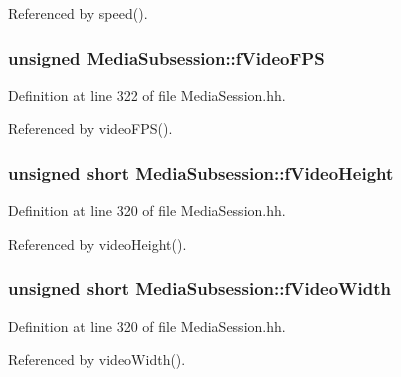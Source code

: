 Referenced by speed().

\subsubsection[{f\+Video\+F\+P\+S}]{\setlength{\rightskip}{0pt plus 5cm}unsigned Media\+Subsession\+::f\+Video\+F\+P\+S\hspace{0.3cm}{\ttfamily [protected]}}\label{classMediaSubsession_adf848c5c77fd1bb0cd391f8e45a63406}


Definition at line 322 of file Media\+Session.\+hh.



Referenced by video\+F\+P\+S().

\subsubsection[{f\+Video\+Height}]{\setlength{\rightskip}{0pt plus 5cm}unsigned short Media\+Subsession\+::f\+Video\+Height\hspace{0.3cm}{\ttfamily [protected]}}\label{classMediaSubsession_a717483e83431af1f2178b7cece5557f4}


Definition at line 320 of file Media\+Session.\+hh.



Referenced by video\+Height().

\subsubsection[{f\+Video\+Width}]{\setlength{\rightskip}{0pt plus 5cm}unsigned short Media\+Subsession\+::f\+Video\+Width\hspace{0.3cm}{\ttfamily [protected]}}\label{classMediaSubsession_a4976e38b9ecc4f0d257eb5bcc6f14417}


Definition at line 320 of file Media\+Session.\+hh.



Referenced by video\+Width().

